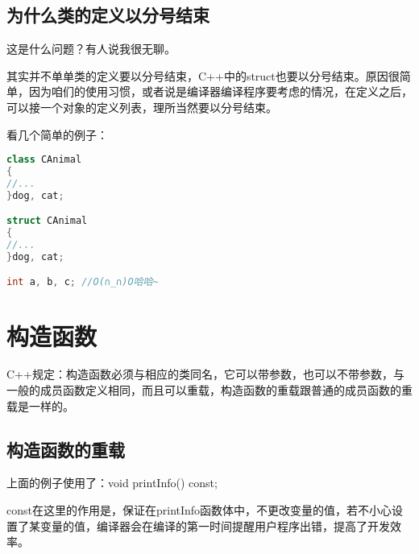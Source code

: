 \documentclass{article}
\begin{document}
\subsection{为什么类的定义以分号结束}
\label{sec-3-8}
这是什么问题？有人说我很无聊。

其实并不单单类的定义要以分号结束，C++中的struct也要以分号结束。原因很简单，因为咱们的使用习惯，或者说是编译器编译程序要考虑的情况，在定义之后，可以接一个对象的定义列表，理所当然要以分号结束。

看几个简单的例子：
\begin{lstlisting}[language=c++]
class CAnimal  
{  
//...  
}dog, cat;  

struct CAnimal  
{  
//...  
}dog, cat;  

int a, b, c; //O(∩_∩)O哈哈~
\end{lstlisting}

\section{构造函数}
\label{sec-4}
C++规定：构造函数必须与相应的类同名，它可以带参数，也可以不带参数，与一般的成员函数定义相同，而且可以重载，构造函数的重载跟普通的成员函数的重载是一样的。

\subsection{构造函数的重载}
\label{sec-4-1}

上面的例子使用了：void printInfo() const;

const在这里的作用是，保证在printInfo函数体中，不更改变量的值，若不小心设置了某变量的值，编译器会在编译的第一时间提醒用户程序出错，提高了开发效率。
\end{document}
